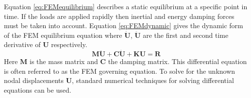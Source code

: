 \documentclass[11pt,a4paper]{report}
\begin{document}
Equation \ref{eq:FEMequilibrium} describes a static equilibrium at a specific
point in time. If the loads are applied rapidly then inertial and
energy damping forces must be taken into account. Equation \ref{eq:FEMdynamic} gives
the dynamic form of the FEM equilibrium equation where $\dot{\mathbf{U}}$, $\ddot{\mathbf{U}}$ are the
first and second time derivative of $\mathbf{U}$ respectively.
\begin{equation}\label{eq:FEMdynamic}
\mathbf{M}\ddot{\mathbf{U}} + \mathbf{C}\dot{\mathbf{U}} + \mathbf{K}\mathbf{U}
= \mathbf{R}
\end{equation}
Here $\mathbf{M}$ is the mass matrix and $\mathbf{C}$ the damping matrix. This differential
equation is often referred to as the FEM governing equation. To solve for the
unknown nodal displacements $\mathbf{U}$, standard numerical techniques for solving
differential equations can be used.
\end{document}
